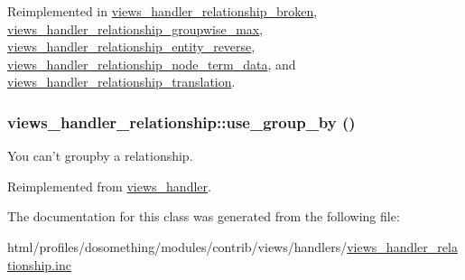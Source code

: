 Reimplemented in \hyperlink{classviews__handler__relationship__broken_a58db24781460cd5b36c08c56df9d56ab}{views\_\-handler\_\-relationship\_\-broken}, \hyperlink{classviews__handler__relationship__groupwise__max_a26fd71d0c45deea3dcd04e40fe58df7c}{views\_\-handler\_\-relationship\_\-groupwise\_\-max}, \hyperlink{classviews__handler__relationship__entity__reverse_a312255f1150208b21b0ad32fb1412f1a}{views\_\-handler\_\-relationship\_\-entity\_\-reverse}, \hyperlink{classviews__handler__relationship__node__term__data_a52e14dbfdfd8ca850baa9fbd4880836d}{views\_\-handler\_\-relationship\_\-node\_\-term\_\-data}, and \hyperlink{classviews__handler__relationship__translation_af1e8ba159a9b04199ff03cad304ca1e4}{views\_\-handler\_\-relationship\_\-translation}.\hypertarget{classviews__handler__relationship_a23a370a6b1ba56280bbfe2262a0c91ec}{
\subsubsection[{use\_\-group\_\-by}]{\setlength{\rightskip}{0pt plus 5cm}views\_\-handler\_\-relationship::use\_\-group\_\-by ()}}
\label{classviews__handler__relationship_a23a370a6b1ba56280bbfe2262a0c91ec}
You can't groupby a relationship. 

Reimplemented from \hyperlink{classviews__handler_a929fa734f0c231cb81f52889652e6aef}{views\_\-handler}.

The documentation for this class was generated from the following file:\begin{DoxyCompactItemize}
\item 
html/profiles/dosomething/modules/contrib/views/handlers/\hyperlink{views__handler__relationship_8inc}{views\_\-handler\_\-relationship.inc}\end{DoxyCompactItemize}
